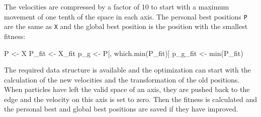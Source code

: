 \documentclass[
  oneside, a4paper, 12pt, openany]{book}
\newenvironment{Shaded}{\begin{snugshade}}{\end{snugshade}}
\newcommand{\FunctionTok}[1]{\textcolor[rgb]{0.00,0.00,0.00}{#1}}
\newcommand{\NormalTok}[1]{#1}
\newcommand{\OtherTok}[1]{\textcolor[rgb]{0.56,0.35,0.01}{#1}}
\theoremstyle{definition}
\theoremstyle{definition}
\theoremstyle{definition}
\theoremstyle{definition}
\theoremstyle{remark}
\begin{document}
\normalsize\vspace{0.1cm}

The velocities are compressed by a factor of 10 to start with a maximum movement of one tenth of the space in each axis. The personal best positions \texttt{P} are the same as \texttt{X} and the global best position is the position with the smallest fitness:

\vspace{0.1cm}\fontsize{11}{12}\selectfont

\begin{Shaded}
\begin{Highlighting}[]
\NormalTok{P }\OtherTok{\textless{}{-}}\NormalTok{ X}
\NormalTok{P\_fit }\OtherTok{\textless{}{-}}\NormalTok{ X\_fit}
\NormalTok{p\_g }\OtherTok{\textless{}{-}}\NormalTok{ P[, }\FunctionTok{which.min}\NormalTok{(P\_fit)]}
\NormalTok{p\_g\_fit }\OtherTok{\textless{}{-}} \FunctionTok{min}\NormalTok{(P\_fit)}
\end{Highlighting}
\end{Shaded}

\normalsize\vspace{0.1cm}

The required data structure is available and the optimization can start with the calculation of the new velocities and the transformation of the old positions. When particles have left the valid space of an axis, they are pushed back to the edge and the velocity on this axis is set to zero. Then the fitness is calculated and the personal best and global best positions are saved if they have improved.

\vspace{0.1cm}\fontsize{11}{12}\selectfont
\end{document}
